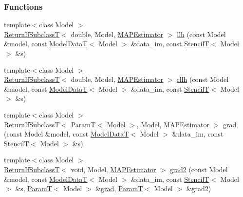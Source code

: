 \subsubsection*{Functions}
\begin{DoxyCompactItemize}
\item 
{\footnotesize template$<$class Model $>$ }\\\hyperlink{namespacemappel_a3b77d227658ba3ba9e16fea6fa6e626d}{Return\+If\+SubclassT}$<$ double, Model, \hyperlink{classmappel_1_1MAPEstimator}{M\+A\+P\+Estimator} $>$ \hyperlink{namespacemappel_1_1methods_1_1objective_a94105ec313ae34d4b30ef78369056eaa}{llh} (const Model \&model, const \hyperlink{namespacemappel_a97f050df953605381ae9c901c3b125f1}{Model\+DataT}$<$ Model $>$ \&data\+\_\+im, const \hyperlink{namespacemappel_a3a06598240007876f8c4bf834ad86197}{StencilT}$<$ Model $>$ \&s)
\item 
{\footnotesize template$<$class Model $>$ }\\\hyperlink{namespacemappel_a3b77d227658ba3ba9e16fea6fa6e626d}{Return\+If\+SubclassT}$<$ double, Model, \hyperlink{classmappel_1_1MAPEstimator}{M\+A\+P\+Estimator} $>$ \hyperlink{namespacemappel_1_1methods_1_1objective_a293c23ed6a623e59477bb67b6e40f5ad}{rllh} (const Model \&model, const \hyperlink{namespacemappel_a97f050df953605381ae9c901c3b125f1}{Model\+DataT}$<$ Model $>$ \&data\+\_\+im, const \hyperlink{namespacemappel_a3a06598240007876f8c4bf834ad86197}{StencilT}$<$ Model $>$ \&s)
\item 
{\footnotesize template$<$class Model $>$ }\\\hyperlink{namespacemappel_a3b77d227658ba3ba9e16fea6fa6e626d}{Return\+If\+SubclassT}$<$ \hyperlink{namespacemappel_a667925cb0d6c0e49f2f035cc5a9a6857}{ParamT}$<$ Model $>$, Model, \hyperlink{classmappel_1_1MAPEstimator}{M\+A\+P\+Estimator} $>$ \hyperlink{namespacemappel_1_1methods_1_1objective_a8e120e5a79029803453cea5f9f2d8f67}{grad} (const Model \&model, const \hyperlink{namespacemappel_a97f050df953605381ae9c901c3b125f1}{Model\+DataT}$<$ Model $>$ \&data\+\_\+im, const \hyperlink{namespacemappel_a3a06598240007876f8c4bf834ad86197}{StencilT}$<$ Model $>$ \&s)
\item 
{\footnotesize template$<$class Model $>$ }\\\hyperlink{namespacemappel_a3b77d227658ba3ba9e16fea6fa6e626d}{Return\+If\+SubclassT}$<$ void, Model, \hyperlink{classmappel_1_1MAPEstimator}{M\+A\+P\+Estimator} $>$ \hyperlink{namespacemappel_1_1methods_1_1objective_a165388f45fa850f2b12c22053296a0c2}{grad2} (const Model \&model, const \hyperlink{namespacemappel_a97f050df953605381ae9c901c3b125f1}{Model\+DataT}$<$ Model $>$ \&data\+\_\+im, const \hyperlink{namespacemappel_a3a06598240007876f8c4bf834ad86197}{StencilT}$<$ Model $>$ \&s, \hyperlink{namespacemappel_a667925cb0d6c0e49f2f035cc5a9a6857}{ParamT}$<$ Model $>$ \&\hyperlink{namespacemappel_1_1methods_1_1objective_a8e120e5a79029803453cea5f9f2d8f67}{grad}, \hyperlink{namespacemappel_a667925cb0d6c0e49f2f035cc5a9a6857}{ParamT}$<$ Model $>$ \&grad2)

\end{DoxyCompactItemize}
